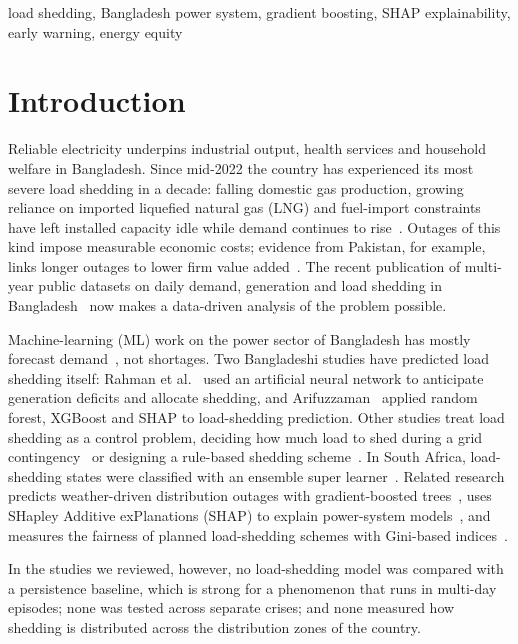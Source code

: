 \documentclass[conference]{IEEEtran}
\begin{document}
\begin{IEEEkeywords}
load shedding, Bangladesh power system, gradient boosting, SHAP explainability, early warning, energy equity
\end{IEEEkeywords}

\section{Introduction}
Reliable electricity underpins industrial output, health services and household welfare in Bangladesh. Since mid-2022 the country has experienced its most severe load shedding in a decade: falling domestic gas production, growing reliance on imported liquefied natural gas (LNG) and fuel-import constraints have left installed capacity idle while demand continues to rise~\cite{cpd2025}. Outages of this kind impose measurable economic costs; evidence from Pakistan, for example, links longer outages to lower firm value added~\cite{grainger2017}. The recent publication of multi-year public datasets on daily demand, generation and load shedding in Bangladesh~\cite{hossain2025,islam2026} now makes a data-driven analysis of the problem possible.

Machine-learning (ML) work on the power sector of Bangladesh has mostly forecast demand~\cite{akhter2024}, not shortages. Two Bangladeshi studies have predicted load shedding itself: Rahman et al.~\cite{rahman2016} used an artificial neural network to anticipate generation deficits and allocate shedding, and Arifuzzaman~\cite{arifuzzaman2026} applied random forest, XGBoost and SHAP to load-shedding prediction. Other studies treat load shedding as a control problem, deciding how much load to shed during a grid contingency~\cite{zhou2024} or designing a rule-based shedding scheme~\cite{gain2025}. In South Africa, load-shedding states were classified with an ensemble super learner~\cite{akinola2024}. Related research predicts weather-driven distribution outages with gradient-boosted trees~\cite{wanik2015,taylor2023}, uses SHapley Additive exPlanations (SHAP) to explain power-system models~\cite{lundberg2017,hamilton2022}, and measures the fairness of planned load-shedding schemes with Gini-based indices~\cite{heylen2018}.

In the studies we reviewed, however, no load-shedding model was compared with a persistence baseline, which is strong for a phenomenon that runs in multi-day episodes; none was tested across separate crises; and none measured how shedding is distributed across the distribution zones of the country.
\end{document}

